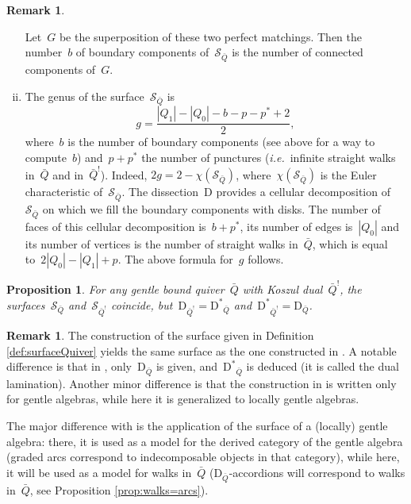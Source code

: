 \documentclass{amsart}
\newtheorem{proposition}[theorem]{Proposition}
\theoremstyle{definition}
\newtheorem{remark}[theorem]{Remark}
\newcommand{\ie}{\textit{i.e.}~} %
\newcommand{\surface}{\mathcal{S}} %
\newcommand{\dual}{^*} %
\newcommand{\dissection}{\mathrm{D}} %
\newcommand{\koszul}{^!} %
\begin{document}
\begin{remark}
\begin{enumerate}[(i)]
      Let~$G$ be the superposition of these two perfect matchings.
      Then the number~$b$ of boundary components of~$\surface_{\bar Q}$ is the number of connected components of~$G$.
\item The genus of the surface~$\surface_{\bar Q}$ is
      \[
       g = \frac{|Q_1| - |Q_0| - b - p - p\dual + 2}{2},
      \]
      where~$b$ is the number of boundary components (see above for a way to compute~$b$) and~$p + p\dual$ the number of punctures (\ie infinite straight walks in~$\bar Q$ and in~$\bar Q\koszul$).
      Indeed, ${2g = 2-\chi(\surface_{\bar Q})}$, where~$\chi(\surface_{\bar Q})$ is the Euler characteristic of~$\surface_{\bar Q}$.
      The dissection~$\dissection$ provides a cellular decomposition of~$\surface_{\bar Q}$ on which we fill the boundary components with disks.  
      The number of faces of this cellular decomposition is~$b + p\dual$, its number of edges is~$|Q_0|$ and its number of vertices is the number of straight walks in~$\bar Q$, which is equal to~$2|Q_0| - |Q_1| + p$.
      The above formula for~$g$ follows.
\end{enumerate}
\end{remark}

\begin{proposition}
\label{prop:dualityKoszul2}
For any gentle bound quiver~$\bar Q$ with Koszul dual~$\bar Q\koszul$, the surfaces~$\surface_{\bar Q}$ and~$\surface_{\bar Q\koszul}$ coincide, but~$\dissection_{\bar Q\koszul} = {\dissection\dual\!\!_{\bar Q}}$ and~${\dissection\dual\!\!_{\bar Q\koszul}} = \dissection_{\bar Q}$.
\end{proposition}

\begin{remark}
\label{rem:comparisonWithOPS}
The construction of the surface given in Definition \ref{def:surfaceQuiver} yields the same surface as the one constructed in \cite{OpperPlamondonSchroll}.
A notable difference is that in \cite{OpperPlamondonSchroll}, only~$\dissection_{\bar Q}$ is given, and~$\dissection\dual\!\!_{\bar Q}$ is deduced (it is called the dual lamination).
Another minor difference is that the construction in \cite{OpperPlamondonSchroll} is written only for gentle algebras, while here it is generalized to locally gentle algebras.

The major difference with \cite{OpperPlamondonSchroll} is the application of the surface of a (locally) gentle algebra: there, it is used as a model for the derived category of the gentle algebra (graded arcs correspond to indecomposable objects in that category), while here, it will be used as a model for walks in~$\bar Q$ ($\dissection_{\bar Q}$-accordions will correspond to walks in~$\bar{Q}$, see Proposition \ref{prop:walks=arcs}).
\end{remark}
\end{document}
